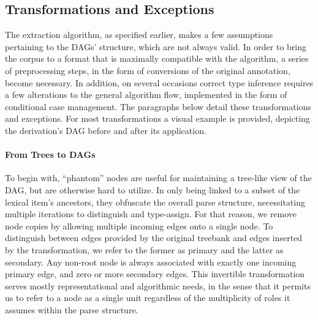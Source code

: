 \subsection{Transformations and Exceptions}
\label{subsec:transformations}

The extraction algorithm, as specified earlier, makes a few assumptions pertaining to the DAGs' structure, which are not always valid.
In order to bring the corpus to a format that is maximally compatible with the algorithm, a series of preprocessing steps, in the form of conversions of the original annotation, become necessary.
In addition, on several occasions correct type inference requires a few alterations to the general algorithm flow, implemented in the form of conditional case management.
The paragraphs below detail these transformations and exceptions.
For most transformations a visual example is provided, depicting the derivation's DAG before and after its application.

\paragraph{From Trees to DAGs}
To begin with, ``phantom'' nodes are useful for maintaining a tree-like view of the DAG, but are otherwise hard to utilize.
In only being linked to a subset of the lexical item's ancestors, they obfuscate the overall parse structure, necessitating multiple iterations to distinguish and type-assign.
For that reason, we remove node copies by allowing multiple incoming edges onto a single node.
To distinguish between edges provided by the original treebank and edges inserted by the transformation, we refer to the former as primary and the latter as secondary.
Any non-root node is always associated with exactly one incoming primary edge, and zero or more secondary edges.
This invertible transformation serves mostly representational and algorithmic needs, in the sense that it permits us to refer to a node as a single unit regardless of the multiplicity of roles it assumes within the parse structure. 

